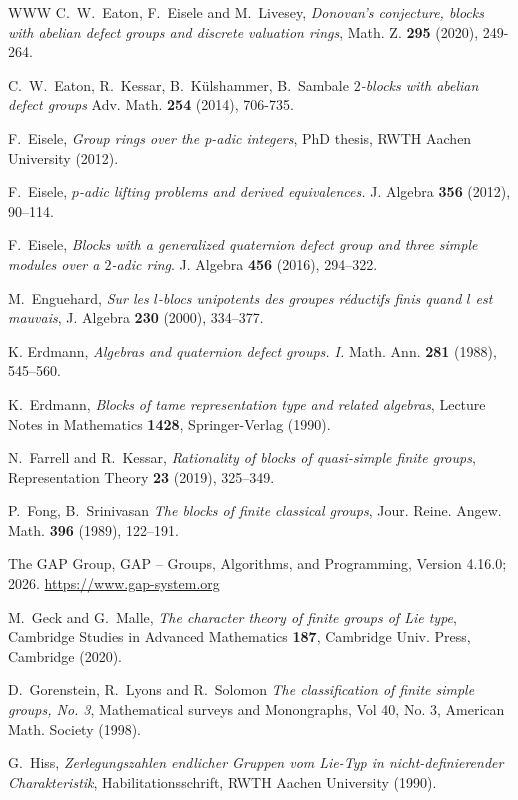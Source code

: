 \documentclass{amsart}
\theoremstyle{plain}\newtheorem{Theorem}{Theorem}[section]
\theoremstyle{plain}\newtheorem{Conjecture}[Theorem]{Conjecture}
\theoremstyle{plain}\newtheorem{Corollary}[Theorem]{Corollary}
\theoremstyle{plain}\newtheorem{Lemma}[Theorem]{Lemma}
\theoremstyle{plain}\newtheorem{Proposition}[Theorem]{Proposition}
\theoremstyle{definition}\newtheorem{Definition}[Theorem]{Definition}
\theoremstyle{definition}\newtheorem{Example}[Theorem]{Example}
\theoremstyle{definition}\newtheorem{Examples}[Theorem]{Examples}
\theoremstyle{definition}\newtheorem{Exercise}[Theorem]{Exercise}
\theoremstyle{definition}\newtheorem{Notation}[Theorem]{Notation}
\theoremstyle{definition}\newtheorem{Remark}[Theorem]{Remark}
\theoremstyle{definition}\newtheorem{Remarks}[Theorem]{Remarks}
\numberwithin{equation}{section}
\begin{document}
\begin{thebibliography}{WWW}
 C.~W.~Eaton, F.~Eisele and M.~Livesey, \emph{Donovan's conjecture, blocks with abelian defect groups and discrete valuation rings}, Math. Z. {\bf295} (2020), 249-264.



 C.~W.~Eaton, R.~Kessar, B.~K\"ulshammer, B.~Sambale \emph{$2$-blocks with abelian defect groups} Adv. Math. {\bf254} (2014), 706-735.

F.~Eisele,  {\em Group rings over the p-adic integers}, PhD thesis, RWTH Aachen University (2012).

F.~Eisele, {\em{$p$}-adic lifting problems and derived equivalences.}
J. Algebra {\bf356} (2012), 90--114.

 F.~Eisele, {\em Blocks with a generalized quaternion defect group and 
three simple modules over a $2$-adic ring}. J. Algebra {\bf 456} (2016), 294--322.

M.~Enguehard, \emph{Sur les $l$-blocs unipotents des groupes r\'eductifs finis quand $l$ est mauvais}, J. Algebra {\bf 230} (2000), 334--377.

 K. Erdmann, {\em Algebras and quaternion defect groups. I.} 
Math. Ann. {\bf 281} (1988), 545--560.

 K.~Erdmann, \emph{Blocks of tame representation type and related algebras}, Lecture Notes in Mathematics {\bf1428}, Springer-Verlag (1990).

 N.~Farrell and R.~Kessar, {\em  Rationality of blocks of  quasi-simple finite  groups}, Representation Theory {\bf23} (2019), 325--349.


  P.~Fong, B.~Srinivasan {\em The blocks of finite classical groups},  Jour. Reine. Angew. Math. {\bf396} (1989), 122--191.

The GAP Group, GAP -- Groups, Algorithms, and Programming, Version 4.16.0; 2026. \url{https://www.gap-system.org}

M.~Geck and G.~Malle, \emph{The character theory of finite groups of Lie type}, Cambridge Studies in Advanced Mathematics {\bf187}, Cambridge Univ. Press, Cambridge (2020).

  D.~Gorenstein,  R.~Lyons and R.~Solomon {\em The classification of finite simple groups, No. 3},  Mathematical surveys and Monongraphs, Vol 40, No. 3, American Math. Society (1998). 

G.~Hiss, \emph{Zerlegungszahlen endlicher Gruppen vom Lie-Typ in nicht-definierender Charakteristik}, Habilitationsschrift, RWTH Aachen University (1990).



\end{thebibliography}
\end{document}
